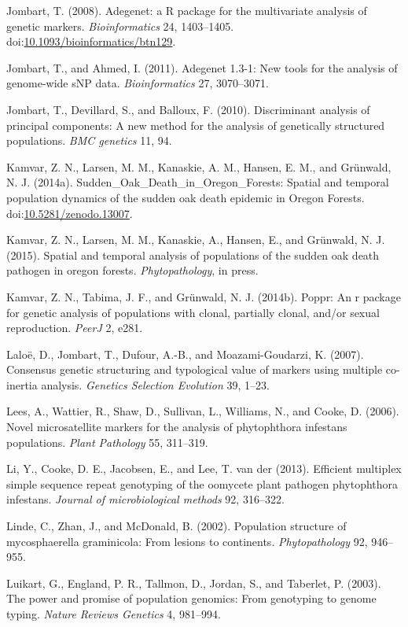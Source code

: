 \documentclass{frontiersSCNS} %
\begin{document}
Jombart, T. (2008). Adegenet: a R package for the multivariate analysis
of genetic markers. \emph{Bioinformatics} 24, 1403--1405.
doi:\href{http://dx.doi.org/10.1093/bioinformatics/btn129}{10.1093/bioinformatics/btn129}.

Jombart, T., and Ahmed, I. (2011). Adegenet 1.3-1: New tools for the
analysis of genome-wide sNP data. \emph{Bioinformatics} 27, 3070--3071.

Jombart, T., Devillard, S., and Balloux, F. (2010). Discriminant
analysis of principal components: A new method for the analysis of
genetically structured populations. \emph{BMC genetics} 11, 94.

Kamvar, Z. N., Larsen, M. M., Kanaskie, A. M., Hansen, E. M., and
Grünwald, N. J. (2014a). Sudden\_Oak\_Death\_in\_Oregon\_Forests:
Spatial and temporal population dynamics of the sudden oak death
epidemic in Oregon Forests.
doi:\href{http://dx.doi.org/10.5281/zenodo.13007}{10.5281/zenodo.13007}.

Kamvar, Z. N., Larsen, M. M., Kanaskie, A., Hansen, E., and Grünwald, N.
J. (2015). Spatial and temporal analysis of populations of the sudden
oak death pathogen in oregon forests. \emph{Phytopathology}, in press.

Kamvar, Z. N., Tabima, J. F., and Gr{ü}nwald, N. J. (2014b). Poppr: An r
package for genetic analysis of populations with clonal, partially
clonal, and/or sexual reproduction. \emph{PeerJ} 2, e281.

Lalo{ë}, D., Jombart, T., Dufour, A.-B., and Moazami-Goudarzi, K.
(2007). Consensus genetic structuring and typological value of markers
using multiple co-inertia analysis. \emph{Genetics Selection Evolution}
39, 1--23.

Lees, A., Wattier, R., Shaw, D., Sullivan, L., Williams, N., and Cooke,
D. (2006). Novel microsatellite markers for the analysis of phytophthora
infestans populations. \emph{Plant Pathology} 55, 311--319.

Li, Y., Cooke, D. E., Jacobsen, E., and Lee, T. van der (2013).
Efficient multiplex simple sequence repeat genotyping of the oomycete
plant pathogen phytophthora infestans. \emph{Journal of microbiological
methods} 92, 316--322.

Linde, C., Zhan, J., and McDonald, B. (2002). Population structure of
mycosphaerella graminicola: From lesions to continents.
\emph{Phytopathology} 92, 946--955.

Luikart, G., England, P. R., Tallmon, D., Jordan, S., and Taberlet, P.
(2003). The power and promise of population genomics: From genotyping to
genome typing. \emph{Nature Reviews Genetics} 4, 981--994.
\end{document}
